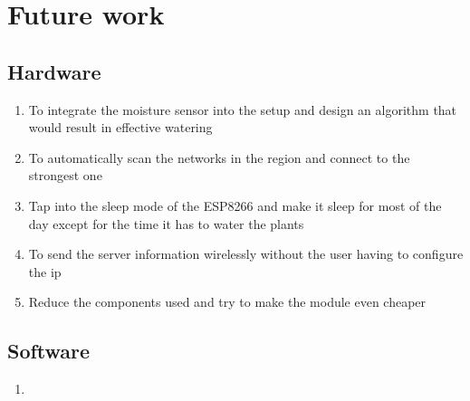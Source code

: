 \documentclass[16pt]{article}
\begin{document}
\section{Future work}

\vspace{0.5cm}

\subsection{Hardware}
\begin{enumerate}
 \item To integrate the moisture sensor into the setup and design an algorithm that would result in effective watering 
 \item To automatically scan the networks in the region and connect to the strongest one
 \item Tap into the sleep mode of the ESP8266 and make it sleep for most of the day except for the time 
 it has to water the plants
 \item To send the server information wirelessly without the user having to configure the ip
 \item Reduce the components used and try to make the module even cheaper  
\end{enumerate}

\vspace{0.5cm}

\subsection{Software}
\begin{enumerate}
 \item 
\end{enumerate}
\end{document}
